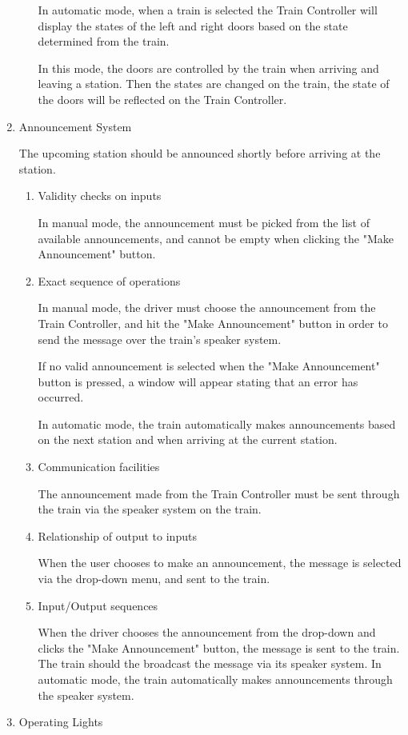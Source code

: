 \documentclass[11pt]{article}
\begin{document}
\begin{enumerate}
\begin{enumerate}
In automatic mode, when a train is selected the Train Controller will display the states of the left and right doors based on the state determined from the train. 

In this mode, the doors are controlled by the train when arriving and leaving a station. Then the states are changed on the train, the state of the doors will be reflected on the Train Controller.
\end{enumerate}
\item Announcement System
\label{sec-3-1-5-4}

The upcoming station should be announced shortly before arriving at the station.
\begin{enumerate}
\item Validity checks on inputs
\label{sec-3-1-5-4-1}

In manual mode, the announcement must be picked from the list of available announcements, and cannot be empty when clicking the "Make Announcement" button. 
\item Exact sequence of operations
\label{sec-3-1-5-4-2}

In manual mode, the driver must choose the announcement from the Train Controller, and hit the "Make Announcement" button in order to send the message over the train's speaker system.

If no valid announcement is selected when the "Make Announcement" button is pressed, a window will appear stating that an error has occurred.  

In automatic mode, the train automatically makes announcements based on the next station and when arriving at the current station. 
\item Communication facilities
\label{sec-3-1-5-4-3}

The announcement made from the Train Controller must be sent through the train via the speaker system on the train. 
\item Relationship of output to inputs
\label{sec-3-1-5-4-4}

When the user chooses to make an announcement, the message is selected via the drop-down menu, and sent to the train. 
\item Input/Output sequences
\label{sec-3-1-5-4-5}

When the driver chooses the announcement from the drop-down and clicks the "Make Announcement" button, the message is sent to the train. The train should the broadcast the message via its speaker system. In automatic mode, the train automatically makes announcements through the speaker system.
\end{enumerate}
\item Operating Lights
\label{sec-3-1-5-5}


\end{enumerate}
\end{document}
